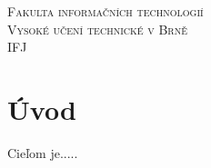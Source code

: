 \documentclass [11pt, a4paper]{article}
\begin{document}
\begin{center}

\Huge
\textsc{Fakulta informačních technologií\\
Vysoké učení technické v Brně}
\\[84mm]
\LARGE IFJ
\vfill
\end{center}
\thispagestyle{empty}
\clearpage

\setcounter{page}{1}
\tableofcontents
\clearpage


\section{Úvod}
Cieľom je.....
\end{document}
